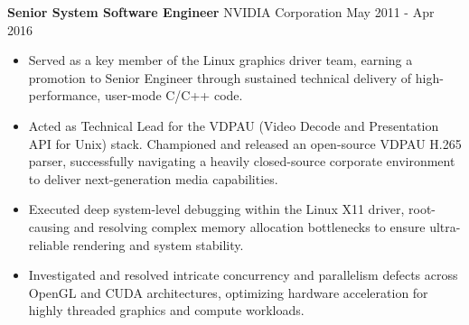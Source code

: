 \textbf{Senior System Software Engineer} NVIDIA Corporation \hfill May 2011 - Apr 2016

\begin{itemize} \itemsep -2pt

\item Served as a key member of the Linux graphics driver team, earning a promotion to Senior Engineer through sustained technical delivery of high-performance, user-mode C/C++ code.

\item Acted as Technical Lead for the VDPAU (Video Decode and Presentation API for Unix) stack. Championed and released an open-source VDPAU H.265 parser, successfully navigating a heavily closed-source corporate environment to deliver next-generation media capabilities.

\item Executed deep system-level debugging within the Linux X11 driver, root-causing and resolving complex memory allocation bottlenecks to ensure ultra-reliable rendering and system stability.

\item Investigated and resolved intricate concurrency and parallelism defects across OpenGL and CUDA architectures, optimizing hardware acceleration for highly threaded graphics and compute workloads.

\end{itemize}
